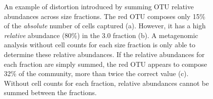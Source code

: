 \begin{figure}
\quad
{}
\caption[Summing relative abundances across size fractions]{An example of distortion introduced by summing OTU relative abundances across size fractions. The red OTU composes only 15\% of the \emph{absolute} number of cells captured (a). However, it has a high \emph{relative} abundance (80\%) in the 3.0 \micron{} fraction (b). A metagenomic analysis without cell counts for each size fraction is only able to determine these relative abundances. If the relative abundances for each fraction are simply summed, the red OTU appears to compose 32\% of the community, more than twice the correct value (c). Without cell counts for each fraction, relative abundances cannot be summed between the fractions.}
\label{fig:fractionabundances}
\end{figure}
